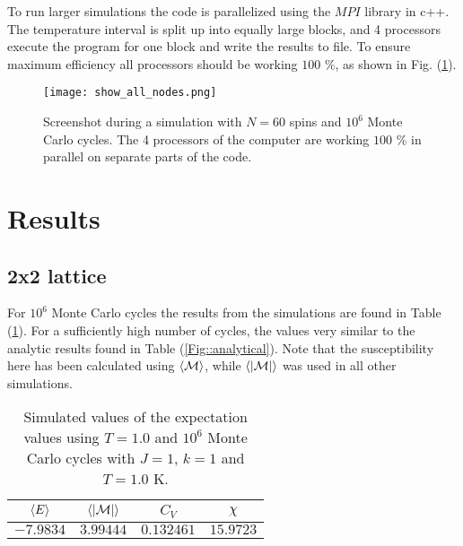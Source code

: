 \documentclass[11pt]{article}
\begin{document}
\begin{flushleft}
To run larger simulations the code is parallelized using the $MPI$ library in c++. The temperature interval is split up into equally large blocks, and 4 processors execute the program for one block and write the results to file. To ensure maximum efficiency all processors should be working $100$ \%, as shown in  Fig. (\ref{efficiency}).

\begin{figure}[H]
\centering
\texttt{[image: show\_all\_nodes.png]}
\caption{Screenshot during a simulation with $N=60$ spins and $10^6$ Monte Carlo cycles. The 4 processors of the computer are working 
$100$ \% in parallel on separate parts of the code.}
\label{efficiency}
\end{figure}



\end{flushleft}

\section*{Results}

\subsection*{2x2 lattice}

\begin{flushleft}
For $10^6$ Monte Carlo cycles the results from the simulations are found in Table (\ref{Fig::values simulated}). For a sufficiently high number of cycles, the values very similar to the analytic results found in Table (\ref{Fig::analytical}). Note that the susceptibility here has been calculated using $\braket{\mathcal{M}}$, while $\braket{|\mathcal{M}|}$ was used in all other simulations.



\begin{table}[H]
\centering
\begin{tabular}{|c|c|c|c|}
\hline
$\braket{E}$ & $\braket{|\mathcal{M}|}$ & $C_V$ & $\chi$\\
\hline
$-7.9834$ & $3.99444$ & $0.132461$ & $15.9723$\\
\hline
\end{tabular}
\caption{Simulated values of the expectation values using $T=1.0$ and $10^6$ Monte Carlo cycles with $J=1$, $k=1$ and $T=1.0$ K.}
\label{Fig::values simulated}
\end{table}

\end{flushleft}
\end{document}
